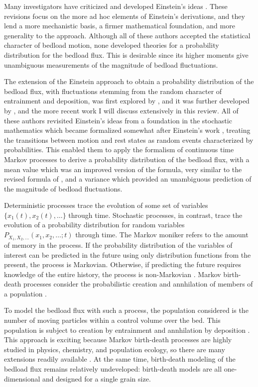 Many investigators have criticized and developed Einstein's ideas \citep{Paintal1971, Yalin1972, Shen1980, Lisle1998, Papanicolaou2002, Sun2000, Ancey2006, Armanini2015}. 
These revisions focus on the more ad hoc elements of Einstein's derivations, and they lend a more mechanistic basis, a firmer mathematical foundation, and more generality to the approach. 
Although all of these authors accepted the statistical character of bedload motion, none developed theories for a probability distribution for the bedload flux. 
This is desirable since its higher moments give unambiguous measurements of the magnitude of bedload fluctuations. 

The extension of the Einstein approach to obtain a probability distribution of the bedload flux, with fluctuations stemming from the random character of entrainment and deposition, was first explored by \citet{Lisle1998, Sun2000}, and it was further developed by \citet{Ancey2006}, and the more recent work I will discuss extensively in this review.   
All of these authors revisited Einstein's ideas from a foundation in the stochastic mathematics which became formalized somewhat after Einstein's work \citep[e.g.][]{Cox1965}, treating the transitions between motion and rest states as random events characterized by probabilities. 
This enabled them to apply the formalism of continuous time Markov processes to derive a probability distribution of the bedload flux, with a mean value which was an improved version of the \citet{Einstein1950} formula, very similar to the revised formula of \citet{Yalin1972}, and a variance which provided an unambiguous prediction of the magnitude of bedload fluctuations. 

Deterministic processes trace the evolution of some set of variables $\{x_1(t),x_2(t),\dots\}$ through time. 
Stochastic processes, in contrast, trace the evolution of a probability distribution for random variables $P_{X_1,X_2,\dots}(x_1,x_2,\dots;t)$ through time. 
The Markov moniker refers to the amount of memory in the process.
If the probability distribution of the variables of interest can be predicted in the future using only distribution functions from the present, the process is Markovian. 
Otherwise, if predicting the future requires knowledge of the entire history, the process is non-Markovian \citep{Cox1965, VanKampen1992}. 
Markov birth-death processes consider the probabilistic creation and annhilation of members of a population \citep{Cox1965, VanKampen1992}.  

To model the bedload flux with such a process, the population considered is the number of moving particles within a control volume over the bed. 
This population is subject to creation by entrainment and annhilation by deposition \citep{Ancey2008, Turowski2009, Heyman2013, Ma2014,  Ancey2014a, Ancey2015}. 
This approach is exciting because Markov birth-death processes are highly studied in physics, chemistry, and population ecology, so there are many extensions readily available \citep{Bailey1968, Cox1965, Pielou1977, VandenBroek2012, VanKampen1992, Gillespie1992, Field2010, Mendez2015}. 
At the same time, birth-death modeling of the bedload flux remains relatively undeveloped: birth-death models are all one-dimensional and designed for a single grain size. 

